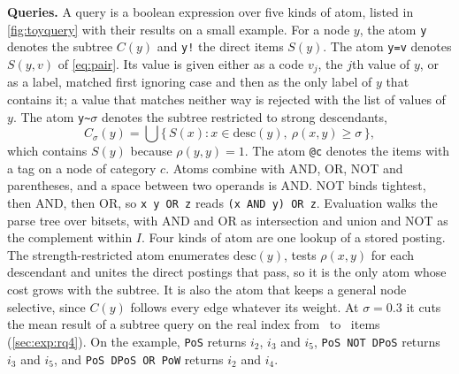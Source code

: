 \textbf{Queries.} A query is a boolean expression over five kinds of atom,
listed in \cref{fig:toyquery} with their results on a small example. For a
node $y$, the atom \texttt{y} denotes the subtree $C(y)$ and \texttt{y!} the
direct items $S(y)$. The atom \texttt{y=v} denotes $S(y, v)$ of
\cref{eq:pair}. Its value is given either as a code $v_j$, the $j$th value of
$y$, or as a label, matched first ignoring case and then as the only label of
$y$ that contains it; a value that matches neither way is rejected with the
list of values of $y$. The atom \texttt{y\textasciitilde}$\sigma$ denotes the
subtree restricted to strong descendants,
\begin{equation}
  \label{eq:strongsub}
  C_\sigma(y) = \bigcup \{\, S(x) : x \in \mathrm{desc}(y),\ \rho(x, y) \ge \sigma \,\},
\end{equation}
which contains $S(y)$ because $\rho(y, y) = 1$. The atom \texttt{@c} denotes
the items with a tag on a node of category $c$. Atoms combine with AND, OR,
NOT and parentheses, and a space between two operands is AND. NOT binds
tightest, then AND, then OR, so \texttt{x y OR z} reads
\texttt{(x AND y) OR z}. Evaluation walks the parse tree over bitsets, with
AND and OR as intersection and union and NOT as the complement within $I$.
Four kinds of atom are one lookup of a stored posting. The
strength-restricted atom enumerates $\mathrm{desc}(y)$, tests $\rho(x, y)$
for each descendant and unites the direct postings that pass, so it is the
only atom whose cost grows with the subtree. It is also the atom that keeps a
general node selective, since $C(y)$ follows every edge whatever its weight.
At $\sigma = 0.3$ it cuts the mean result of a subtree query on the real
index from \RClosureHits\ to \RStrengthHits\ items (\cref{sec:exp:rq4}). On
the example, \texttt{PoS} returns $i_2$, $i_3$ and $i_5$,
\texttt{PoS NOT DPoS} returns $i_3$ and $i_5$, and \texttt{PoS DPoS OR PoW}
returns $i_2$ and $i_4$.

